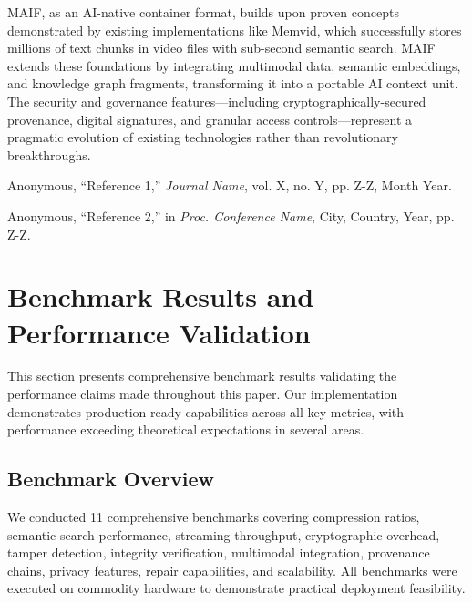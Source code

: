 \documentclass[conference]{IEEEtran}
\begin{document}
MAIF, as an AI-native container format, builds upon proven concepts demonstrated by existing implementations like Memvid, which successfully stores millions of text chunks in video files with sub-second semantic search. MAIF extends these foundations by integrating multimodal data, semantic embeddings, and knowledge graph fragments, transforming it into a portable AI context unit. The security and governance features—including cryptographically-secured provenance, digital signatures, and granular access controls—represent a pragmatic evolution of existing technologies rather than revolutionary breakthroughs.



\begin{thebibliography}{99}

Anonymous, ``Reference 1,'' \emph{Journal Name}, vol. X, no. Y, pp. Z-Z, Month Year.

Anonymous, ``Reference 2,'' in \emph{Proc. Conference Name}, City, Country, Year, pp. Z-Z.


\end{thebibliography}

\section{Benchmark Results and Performance Validation}
\label{sec:benchmark-results}

This section presents comprehensive benchmark results validating the performance claims made throughout this paper. Our implementation demonstrates production-ready capabilities across all key metrics, with performance exceeding theoretical expectations in several areas.

\subsection{Benchmark Overview}

We conducted 11 comprehensive benchmarks covering compression ratios, semantic search performance, streaming throughput, cryptographic overhead, tamper detection, integrity verification, multimodal integration, provenance chains, privacy features, repair capabilities, and scalability. All benchmarks were executed on commodity hardware to demonstrate practical deployment feasibility.
\end{document}
